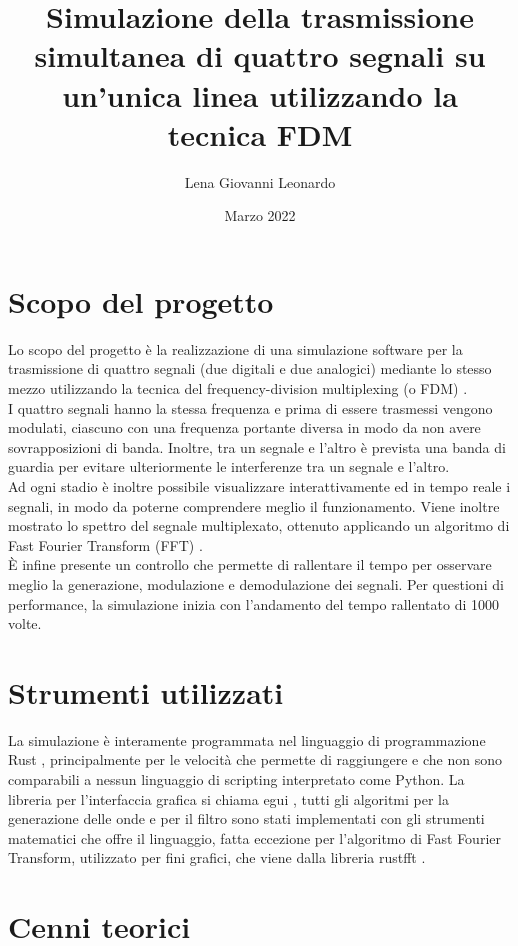 \documentclass{article}
\title{Simulazione della trasmissione simultanea di quattro segnali su un'unica linea utilizzando la tecnica FDM}
\author{Lena Giovanni Leonardo}
\date{Marzo 2022}
\begin{document}
\maketitle

\section{Scopo del progetto}
Lo scopo del progetto è la realizzazione di una simulazione software per la trasmissione di quattro segnali (due digitali
e due analogici) mediante lo stesso mezzo utilizzando la tecnica del frequency-division multiplexing (o FDM) \cite{fdm}.\\
I quattro segnali hanno la stessa frequenza e prima di essere trasmessi vengono modulati, ciascuno con una frequenza
portante diversa in modo da non avere sovrapposizioni di banda. Inoltre, tra un segnale e l'altro è prevista una
banda di guardia per evitare ulteriormente le interferenze tra un segnale e l'altro.\\
Ad ogni stadio è inoltre possibile visualizzare interattivamente ed in tempo reale i segnali, in modo da poterne comprendere
meglio il funzionamento. Viene inoltre mostrato lo spettro del segnale multiplexato, ottenuto applicando un algoritmo di
Fast Fourier Transform (FFT) \cite{fft}.\\
È infine presente un controllo che permette di rallentare il tempo per osservare meglio la generazione, modulazione e demodulazione
dei segnali. Per questioni di performance, la simulazione inizia con l'andamento del tempo rallentato di 1000 volte.

\section{Strumenti utilizzati}
La simulazione è interamente programmata nel linguaggio di programmazione Rust \cite{rust}, principalmente per le velocità che
permette di raggiungere e che non sono comparabili a nessun linguaggio di scripting interpretato come Python. La libreria
per l'interfaccia grafica si chiama egui \cite{egui}, tutti gli algoritmi per la generazione delle onde e per il filtro sono stati
implementati con gli strumenti matematici che offre il linguaggio, fatta eccezione per l'algoritmo di Fast Fourier Transform,
utilizzato per fini grafici, che viene dalla libreria rustfft \cite{rustfft}.

\section{Cenni teorici}
\end{document}
